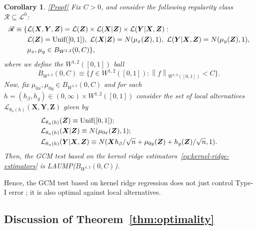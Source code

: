 \documentclass[12pt]{article}
\newtheorem{corollary}{Corollary}
\theoremstyle{definition}
\theoremstyle{remark}
\newcommand{\norm}[1]{\left\lVert{#1}\right\rVert}		%
\newcommand{\prx}{\bm X}								%
\newcommand{\prz}{\bm Z}								%
\newcommand{\pry}{{\bm Y}}								%
\newcommand{\law}{\mathcal L}							%
\newcommand{\nulllaws}{\mathscr L^0}					%
\newcommand{\regclass}{\mathscr R}					    %
\begin{document}
	\begin{corollary}\label{cor:RKHS_example} \hyperref[sec:proof-rkhs]{\textnormal{[Proof]}}
		Fix $C>0$, and consider the following regularity class $\regclass \subseteq \nulllaws$:
		\begin{equation}
			\begin{split}
				\regclass \equiv \{&\law(\prx, \pry, \prz)=\law(\prz)\times \law(\prx|\prz)\times\law(\pry|\prx,\prz):\\
				&\law(\prz) = \textnormal{Unif}([0,1]),\ \law(\prx|\prz) = N(\mu_x(\prz), 1),\ \law(\pry|\prx, \prz) = N(\mu_{y}(\prz), 1), \\
				&\mu_x, \mu_y \in B_{W^{1,2}}(0, C)\},
			\end{split}
		\end{equation}
		where we define the $W^{1,2}([0,1])$ ball
		\begin{equation}
			B_{W^{1,2}}(0, C) \equiv \{f \in W^{1,2}([0,1]): \norm{f}_{W^{1,2}([0,1])} < C\}.
		\end{equation}
		Now, fix $\mu_{0x}, \mu_{0y} \in B_{W^{1,2}}(0, C)$ and for each $h=(h_\beta,h_g)\in(0,\infty)\times W^{1,2}([0,1])$ consider the set of local alternatives $\law_{\theta_n(h)}(\prx, \pry, \prz)$ given by 
		\begin{equation}
			\begin{split}
				&\law_{\theta_n(h)}(\prz) \equiv \textnormal{Unif}([0,1]); \\
				&\law_{\theta_n(h)}(\prx|\prz) \equiv N(\mu_{0x}(\prz), 1); \\
				&\law_{\theta_n(h)}(\pry|\prx, \prz) \equiv N(\prx h_\beta/\sqrt{n} + \mu_{0y}(\prz) + h_g(\prz)/\sqrt{n}, 1).
			\end{split}
		\end{equation}
		Then, the GCM test based on the kernel ridge estimators~\eqref{eq:kernel-ridge-estimators} is LAUMP($B_{W^{1,2}}(0, C)$).
	\end{corollary}
	
	Hence, the GCM test based on kernel ridge regression does not just control Type-I error \citep[Theorem 11]{Shah2018}; it is also optimal against local alternatives.
	
	\subsection{Discussion of Theorem~\ref{thm:optimality}} \label{sec:semiparametric-discussion}
	
\end{document}
